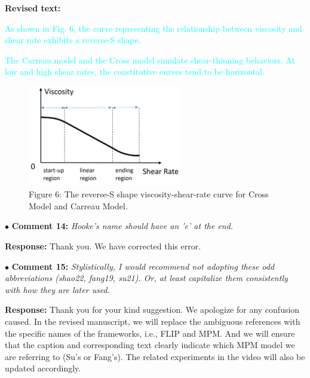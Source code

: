 \documentclass[12pt,a4paper]{article}
\newcommand{\revised}[1]{\textcolor{cyan}{#1}}
\begin{document}
\vspace{0.2cm}
\textbf{Revised text:}

\revised{As shown in Fig. 6, the curve representing the relationship between viscosity and shear rate exhibits a reverse-S shape.}

\revised{
	The Carreau model and the Cross model simulate shear-thinning behaviors. At low and high shear rates, the constitutive curves tend to be horizontal.
}

\begin{figure}[htbp]
	\centering
	\includegraphics[width=0.6\textwidth]{pics/reverse-S.png}
	\captionsetup{labelformat=empty}
	\caption{Figure 6: The reverse-S shape viscosity-shear-rate curve for Cross Model and Carreau Model.}
\end{figure}




\vspace{0.4cm}
\noindent$\bullet$ \enspace \textbf{Comment 14:}
\textit{Hooke's name should have an 'e' at the end.}

\vspace{0.2cm}
\textbf{Response:}
Thank you. We have corrected this error.


\vspace{0.4cm}
\noindent$\bullet$ \enspace \textbf{Comment 15:}
\textit{Stylistically, I would recommend not adopting these odd abbreviations (shao22, fang19, su21). Or, at least capitalize them consistently with how they are later used. }

\vspace{0.2cm}
\textbf{Response:}
Thank you for your kind suggestion. We apologize for any confusion caused. In the revised manuscript, we will replace the ambiguous references with the specific names of the frameworks, i.e., FLIP and MPM. And we will ensure that the caption and corresponding text clearly indicate which MPM model we are referring to (Su's or Fang's). The related experiments in the video will also be updated accordingly.
\end{document}

